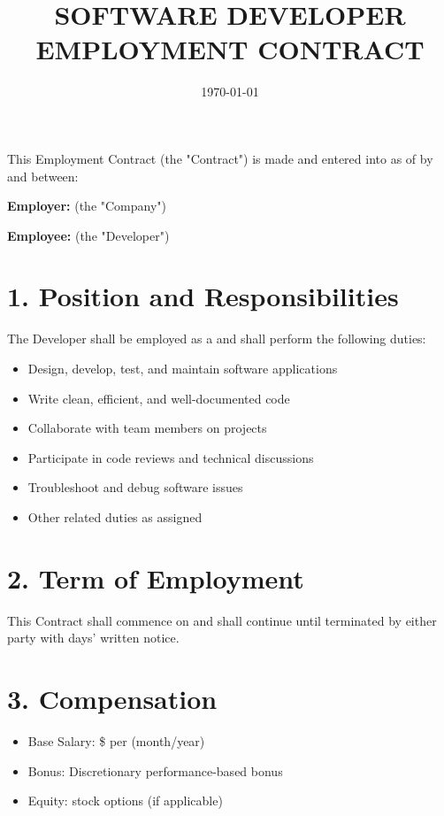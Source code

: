 \documentclass[12pt]{ctexart}
\title{SOFTWARE DEVELOPER EMPLOYMENT CONTRACT}
\author{}
\date{\today}
\begin{document}
\maketitle

This Employment Contract (the "Contract") is made and entered into as of \underline{\hspace{3cm}} by and between:

\noindent\textbf{Employer:} \underline{\hspace{8cm}} (the "Company")

\noindent\textbf{Employee:} \underline{\hspace{8cm}} (the "Developer")

\section*{1. Position and Responsibilities}
The Developer shall be employed as a \underline{\hspace{4cm}} and shall perform the following duties:
\begin{itemize}[leftmargin=*]
    \item Design, develop, test, and maintain software applications
    \item Write clean, efficient, and well-documented code
    \item Collaborate with team members on projects
    \item Participate in code reviews and technical discussions
    \item Troubleshoot and debug software issues
    \item Other related duties as assigned
\end{itemize}

\section*{2. Term of Employment}
This Contract shall commence on \underline{\hspace{3cm}} and shall continue until terminated by either party with \underline{\hspace{2cm}} days' written notice.

\section*{3. Compensation}
\begin{itemize}[leftmargin=*]
    \item Base Salary: \$ \underline{\hspace{4cm}} per \underline{\hspace{2cm}} (month/year)
    \item Bonus: Discretionary performance-based bonus
    \item Equity: \underline{\hspace{4cm}} stock options (if applicable)
\end{itemize}
\end{document}
